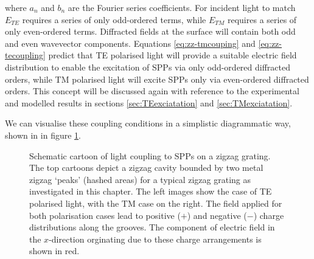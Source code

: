 where $a_n$ and $b_n$ are the Fourier series coefficients. For incident light to match $E_{TE}$ requires a series of only odd-ordered terms, while $E_{TM}$ requires a series of only even-ordered terms. Diffracted fields at the surface will contain both odd and even wavevector components. Equations \ref{eq:zz-tmcouping} and \ref{eq:zz-tecoupling} predict that TE polarised light will provide a suitable electric field distribution to enable the excitation of SPPs via only odd-ordered diffracted orders, while TM polarised light will excite SPPs only via even-ordered diffracted orders.  This concept will be discussed again with reference to the experimental and modelled results in sections \ref{sec:TEexciatation} and \ref{sec:TMexciatation}.

We can visualise these coupling conditions in a simplistic diagrammatic way, shown in in figure \ref{fig:coupling-cartoon}.
\begin{figure}
\begin{center}

\caption[Schematic cartoon of light coupling to SPPs on a zigzag grating.]{Schematic cartoon of light coupling to SPPs on a zigzag grating. The top cartoons depict a zigzag cavity bounded by two metal zigzag `peaks' (hashed areas) for a typical zigzag grating as investigated in this chapter. The left images show the case of TE polarised light, with the TM case on the right. The field applied for both polarisation cases lead to positive ($+$) and negative ($-$) charge distributions along the grooves. The component of electric field in the $x$-direction orginating due to these charge arrangements is shown in red.\label{fig:coupling-cartoon}}
\end{center}
\end{figure}
